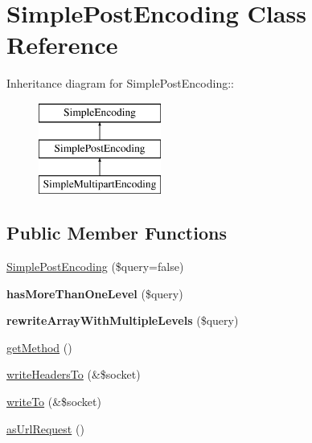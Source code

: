 \hypertarget{class_simple_post_encoding}{
\section{SimplePostEncoding Class Reference}
\label{class_simple_post_encoding}
}
Inheritance diagram for SimplePostEncoding::\begin{figure}[H]
\begin{center}
\leavevmode
\includegraphics[height=3cm]{class_simple_post_encoding}
\end{center}
\end{figure}
\subsection*{Public Member Functions}
\begin{DoxyCompactItemize}
\item 
\hyperlink{class_simple_post_encoding_a15a21e5b65b2494c2e9136e18d05ff6b}{SimplePostEncoding} (\$query=false)
\item 
\hypertarget{class_simple_post_encoding_a3f6da8ff7afcf72408763f96beaf1d49}{
{\bfseries hasMoreThanOneLevel} (\$query)}
\label{class_simple_post_encoding_a3f6da8ff7afcf72408763f96beaf1d49}

\item 
\hypertarget{class_simple_post_encoding_a97293f288c50afa30e3d45ff9573dbe8}{
{\bfseries rewriteArrayWithMultipleLevels} (\$query)}
\label{class_simple_post_encoding_a97293f288c50afa30e3d45ff9573dbe8}

\item 
\hyperlink{class_simple_post_encoding_aa2adc333f1f0528f7f20afbd85b0f563}{getMethod} ()
\item 
\hyperlink{class_simple_post_encoding_a4e637e85bb8511a0b38e234388cb330b}{writeHeadersTo} (\&\$socket)
\item 
\hyperlink{class_simple_post_encoding_a45d035ce0ffe9358dd7e30c657f2fa5e}{writeTo} (\&\$socket)
\item 
\hyperlink{class_simple_post_encoding_a037637d756843001ce01261e253b16a3}{asUrlRequest} ()
\end{DoxyCompactItemize}


